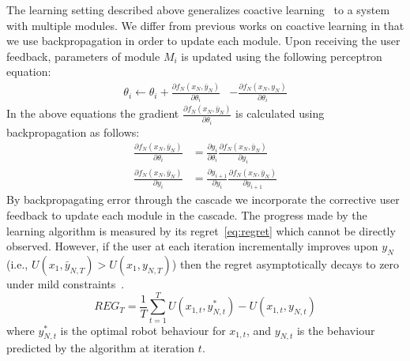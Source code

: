 The learning setting described above generalizes coactive learning~\citep{Jain13,Shivaswamy12} to a system with multiple modules. We differ from previous works on coactive learning in that we use  backpropagation in order to update each module. Upon receiving the user feedback, parameters of module $M_i$ is updated using the following perceptron equation:  
\begin{align}
\theta_i \leftarrow \theta_i +  \frac{\partial f_N(x_N,\bar{y}_N)}{\partial \theta_i} &- \frac{\partial f_N(x_N,{y}_N)}{\partial \theta_i}
\end{align}
In the above equations the	 gradient $\frac{\partial f_N(x_N,\bar{y}_N)}{\partial \theta_i}$ is calculated using backpropagation as follows:
\begin{align}
\frac{\partial f_N(x_N,\bar{y}_N)}{\partial \theta_i} &= \frac{\partial y_i}{\partial \theta_i}  \frac{\partial f_N(x_N,\bar{y}_N)	}{\partial y_{i}}\\
\frac{\partial f_N(x_N,\bar{y}_N)	}{\partial y_{i}} &= \frac{\partial y_{i+1}	}{\partial y_{i}} \frac{\partial f_N(x_N,\bar{y}_N)	}{\partial y_{i+1}}
\end{align}
By backpropagating error through the cascade we  incorporate the corrective user feedback to update each module in the cascade. The progress made by the learning algorithm is measured by its regret~\eqref{eq:regret} which cannot be directly observed. However, if the user at each iteration incrementally improves upon $y_N$ (i.e., $U(x_1,\bar{y}_{N,T}) > U(x_1,{y}_{N,T})$) then the regret asymptotically decays to zero under mild constraints~\citep{Shivaswamy12,Jain13}. 
\begin{equation}
\label{eq:regret}
REG_T = \frac{1}{T}\sum_{t=1}^T U(x_{1,t},y_{N,t}^*) - U(x_{1,t},y_{N,t}) 
\end{equation}
where $y_{N,t}^*$ is the optimal robot behaviour for $x_{1,t}$, and $y_{N,t}$ is the behaviour predicted by the algorithm at iteration $t$. 